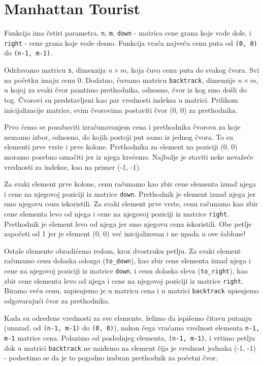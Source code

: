 \section{Manhattan Tourist}

Funkcija ima četiri parametra, \texttt{n}, \texttt{m}, \texttt{down} - matrica cene grana koje vode dole, i \texttt{right} - cene grana koje vode desno. Funkcija vraća najveću cenu puta od \texttt{(0, 0)} do \texttt{(n-1, m-1)}.

Održavamo matricu \texttt{s}, dimenzija $n\times m$, koja čuva cenu puta do svakog čvora. Svi na početku imaju cenu 0. Dodatno, čuvamo matricu \texttt{backtrack}, dimenzije $n \times m$, u kojoj za svaki čvor pamtimo prethodnika, odnosno, čvor iz kog smo došli do tog. Čvorovi su predstavljeni kao par vrednosti indeksa u matrici. Prilikom inicijalizacije matrice, svim čvorovima postaviti čvor (0, 0) za prethodnika.

Prvo ćemo se pozabaviti izračunavanjem cena i prethodnika čvorova za koje nemamo izbor, odnosno, do kojih postoji put samo iz jednog čvora. To su elementi prve vrste i prve kolone. Prethodnika za element na poziciji (0, 0) moramo posebno označiti jer iz njega krećemo. Najbolje je staviti neke nevažeće vrednosti za indekse, kao na primer (-1, -1).

Za svaki element prve kolone, cenu računamo kao zbir cene elementa iznad njega i cene na njegovoj poziciji iz matrice \texttt{down}. Prethodnik je element iznad njega jer smo njegovu cenu iskoristili. Za svaki element prve vrste, cenu računamo kao zbir cene elementa levo od njega i cene na njegovoj poziciji iz matrice \texttt{right}. Prethodnik je element levo od njega jer smo njegovu cenu iskoristili. Obe petlje započeti od 1 jer je element (0, 0) već inicijalizovan i ne upada u ove šablone!

Ostale elemente obradićemo redom, kroz dvostruku petlju. Za svaki element računamo cenu dolaska odozgo (\texttt{to\_down}), kao zbir cene elementa iznad njega i cene na njegovoj poziciji iz matrice \texttt{down}, i cenu dolaska sleva (\texttt{to\_right}), kao zbir cene elementa levo od njega i cene na njegovoj poziciji iz matrice \texttt{right}. Biramo veću cenu, zapisujemo je u matricu cena i u matrici \texttt{backtrack} upisujemo odgovarajući čvor za prethodnika.

Kada su određene vrednosti za sve elemente, želimo da ispišemo čitavu putanju (unazad, od \texttt{(n-1, m-1)} do \texttt{(0, 0)}), nakon čega vraćamo vrednost elementa \texttt{n-1, m-1} matrice cena. Polazimo od poslednjeg elementa, \texttt{(n-1, m-1)}, i vrtimo petlju dok u matrici \texttt{backtrack} ne naiđemo na element čija je vrednost jednaka (-1, -1) - podsetimo se da je to pogodno izabran prethodnik za početni čvor.



